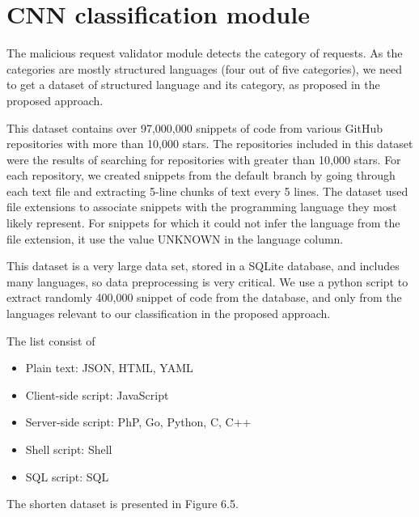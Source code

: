 \newpage
\section{CNN classification module}
\label{sec:CNN_module}
\hspace{0.5cm}The malicious request validator module detects the category of requests. As the categories are mostly structured languages (four out of five categories), we need to get a dataset of structured language and its category, as proposed in the proposed approach.

This dataset contains over 97,000,000 snippets of code from various GitHub repositories with more than 10,000 stars. The repositories included in this dataset were the results of searching for repositories with greater than 10,000 stars. For each repository, we created snippets from the default branch by going through each text file and extracting 5-line chunks of text every 5 lines. The dataset used file extensions to associate snippets with the programming language they most likely represent. For snippets for which it could not infer the language from the file extension, it use the value UNKNOWN in the language column.

This dataset is a very large data set, stored in a SQLite database, and includes many languages, so data preprocessing is very critical. We use a python script to extract randomly 400,000 snippet of code from the database, and only from the languages relevant to our classification in the proposed approach.

The list consist of
\begin{itemize}
	\item Plain text: JSON, HTML, YAML
	\item Client-side script: JavaScript
	\item Server-side script: PhP, Go, Python, C, C++
	\item Shell script: Shell
	\item SQL script: SQL 
\end{itemize}

The shorten dataset is presented in Figure 6.5.

